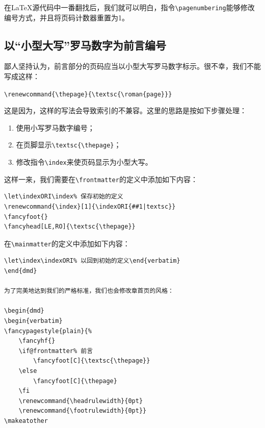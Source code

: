 在\LaTeX 源代码中一番翻找后，我们就可以明白，指令\verb|\pagenumbering|能够修改编号方式，并且将页码计数器重置为1。

%
%
\fancyhf{}
\fancyhead[LE]{\ongletpaire\bfseries\thepage}
\fancyhead[RO]{\bfseries\thepage\ongletimpaire}
\fancyhead[LO]{\bfseries\rightmark}
\fancyhead[RE]{\bfseries\leftmark}
\renewcommand{\footrulewidth}{0pt}

\subsection{以“小型大写”罗马数字为前言编号}

鄙人坚持认为，前言部分的页码应当以小型大写罗马数字标示。很不幸，我们不能写成这样：

\begin{dmd}
\verb|\renewcommand{\thepage}{\textsc{\roman{page}}}|
\end{dmd}

这是因为，这样的写法会导致索引的不兼容。这里的思路是按如下步骤处理：

\begin{enumerate}
    \item 使用小写罗马数字编号；
    \item 在页脚显示\verb|\textsc{\thepage}|；
    \item 修改指令\verb|\index|来使页码显示为小型大写。
\end{enumerate}

这样一来，我们需要在\verb|\frontmatter|的定义中添加如下内容：

\begin{dmd}
\begin{verbatim}
\let\indexORI\index% 保存初始的定义
\renewcommand{\index}[1]{\indexORI{##1|textsc}} 
\fancyfoot{}
\fancyhead[LE,RO]{\textsc{\thepage}}\end{verbatim}
\end{dmd}

在\verb|\mainmatter|的定义中添加如下内容：

\begin{dmd}
\begin{verbatim}
\let\index\indexORI% 以回到初始的定义\end{verbatim}
\end{dmd}

为了完美地达到我们的严格标准，我们也会修改章首页的风格：

\begin{dmd}
\begin{verbatim}
\fancypagestyle{plain}{% 
    \fancyhf{}
    \if@frontmatter% 前言
        \fancyfoot[C]{\textsc{\thepage}}
    \else
        \fancyfoot[C]{\thepage}
    \fi
    \renewcommand{\headrulewidth}{0pt}
    \renewcommand{\footrulewidth}{0pt}}
\makeatother\end{verbatim}
\end{dmd}

